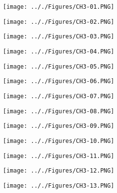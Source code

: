 \documentclass[onecolumn,11pt]{report}
\def\lthtmlcheckvsize{\ifdim\ht\sizebox<\vsize 
  \ifdim\wd\sizebox<\hsize\expandafter\hfill\fi \expandafter\vfill
  \else\expandafter\vss\fi}%
\begin{document}
{\newpage\clearpage
{}%
\texttt{[image: .././Figures/CH3-01.PNG]}%
\lthtmlpictureZ
\lthtmlcheckvsize\clearpage}

{\newpage\clearpage
{}%
\texttt{[image: .././Figures/CH3-02.PNG]}%
\lthtmlpictureZ
\lthtmlcheckvsize\clearpage}

{\newpage\clearpage
{}%
\texttt{[image: .././Figures/CH3-03.PNG]}%
\lthtmlpictureZ
\lthtmlcheckvsize\clearpage}

{\newpage\clearpage
{}%
\texttt{[image: .././Figures/CH3-04.PNG]}%
\lthtmlpictureZ
\lthtmlcheckvsize\clearpage}

{\newpage\clearpage
{}%
\texttt{[image: .././Figures/CH3-05.PNG]}%
\lthtmlpictureZ
\lthtmlcheckvsize\clearpage}

{\newpage\clearpage
{}%
\texttt{[image: .././Figures/CH3-06.PNG]}%
\lthtmlpictureZ
\lthtmlcheckvsize\clearpage}

{\newpage\clearpage
{}%
\texttt{[image: .././Figures/CH3-07.PNG]}%
\lthtmlpictureZ
\lthtmlcheckvsize\clearpage}

{\newpage\clearpage
{}%
\texttt{[image: .././Figures/CH3-08.PNG]}%
\lthtmlpictureZ
\lthtmlcheckvsize\clearpage}

{\newpage\clearpage
{}%
\texttt{[image: .././Figures/CH3-09.PNG]}%
\lthtmlpictureZ
\lthtmlcheckvsize\clearpage}

{\newpage\clearpage
{}%
\texttt{[image: .././Figures/CH3-10.PNG]}%
\lthtmlpictureZ
\lthtmlcheckvsize\clearpage}

{\newpage\clearpage
{}%
\texttt{[image: .././Figures/CH3-11.PNG]}%
\lthtmlpictureZ
\lthtmlcheckvsize\clearpage}

{\newpage\clearpage
{}%
\texttt{[image: .././Figures/CH3-12.PNG]}%
\lthtmlpictureZ
\lthtmlcheckvsize\clearpage}

{\newpage\clearpage
{}%
\texttt{[image: .././Figures/CH3-13.PNG]}%
\lthtmlpictureZ
\lthtmlcheckvsize\clearpage}
\end{document}

